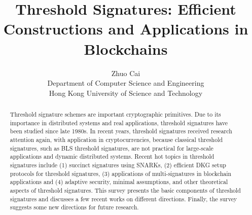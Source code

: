 \documentclass[11pt]{article}
\begin{document}
%
\title{Threshold Signatures: Efficient Constructions and Applications in Blockchains}
%
%
\author{Zhuo Cai\\Department of Computer Science and Engineering\\Hong Kong University of Science and Technology}
%
%
%
\maketitle              %
%
\begin{abstract}
Threshold signature schemes are important cryptographic primitives. Due to its importance in distributed systems and real applications, threshold signatures have been studied since late 1980s. In recent years, threshold signatures received research attention again, with application in cryptocurrencies, because classical threshold signatures, such as BLS threshold signatures, are not practical for large-scale applications and dynamic distributed systems. Recent hot topics in threshold signatures include (1) succinct signatures using SNARKs, (2) efficient DKG setup protocols for threshold signatures, (3) applications of multi-signatures in blockchain applications and (4) adaptive security, minimal assumptions, and other theoretical aspects of threshold signatures. This survey presents the basic components of threshold signatures and discusses a few recent works on different directions. Finally, the survey suggests some new directions for future research. 
\end{abstract}
%
%
\newpage
\tableofcontents

\newpage


\newpage


\newpage


\newpage


\newpage


\newpage


\newpage


\newpage


\newpage
\end{document}
